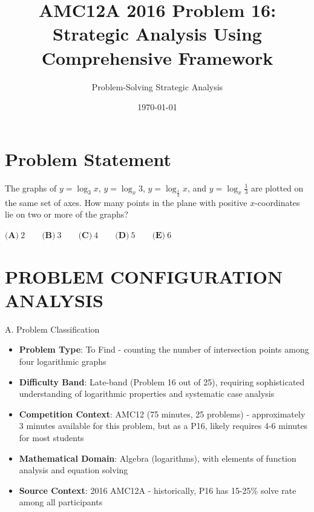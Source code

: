 \documentclass[12pt]{article}
\title{\textbf{AMC12A 2016 Problem 16:\\Strategic Analysis Using Comprehensive Framework}}
\author{Problem-Solving Strategic Analysis}
\date{\today}
\begin{document}
\maketitle

\section*{Problem Statement}

The graphs of $y=\log_3 x$, $y=\log_x 3$, $y=\log_{\frac{1}{3}} x$, and $y=\log_x \frac{1}{3}$ are plotted on the same set of axes. How many points in the plane with positive $x$-coordinates lie on two or more of the graphs?

$\textbf{(A)}\ 2\qquad\textbf{(B)}\ 3\qquad\textbf{(C)}\ 4\qquad\textbf{(D)}\ 5\qquad\textbf{(E)}\ 6$

\newpage

\section{PROBLEM CONFIGURATION ANALYSIS}

\begin{problemconfigbox}{A. Problem Classification}
\begin{itemize}[leftmargin=*]
    \item \textbf{Problem Type}: To Find - counting the number of intersection points among four logarithmic graphs
    
    \item \textbf{Difficulty Band}: Late-band (Problem 16 out of 25), requiring sophisticated understanding of logarithmic properties and systematic case analysis
    
    \item \textbf{Competition Context}: AMC12 (75 minutes, 25 problems) - approximately 3 minutes available for this problem, but as a P16, likely requires 4-6 minutes for most students
    
    \item \textbf{Mathematical Domain}: Algebra (logarithms), with elements of function analysis and equation solving
    
    \item \textbf{Source Context}: 2016 AMC12A - historically, P16 has 15-25\% solve rate among all participants
\end{itemize}
\end{problemconfigbox}
\end{document}
